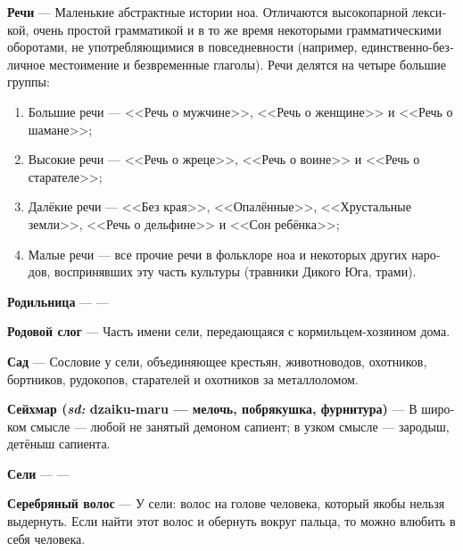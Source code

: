 \documentclass[a4paper,12pt,fleqn]{book}\usepackage{cooltooltips}\usepackage{polyglossia}\setdefaultlanguage[babelshorthands=true]{russian}\setotherlanguage{english}\defaultfontfeatures{Ligatures=TeX,Mapping=tex-text} \usepackage{xcolor}\definecolor{lightgray}{HTML}{bbbbbb}\color{lightgray}\newcommand{\ml}[3]{\textenglish{\textcolor{black}{#3}}}
\newcommand{\theterm}[3]{\textbf{\hypertarget{#1}{#2}} --- #3}
\newcommand{\theorigin}[3]{\textit{#1:} #2 --- #3}
\begin{document}
{\theterm{talks}
{Речи}
{Маленькие абстрактные истории ноа.
Отличаются высокопарной лексикой, очень простой грамматикой и в то же время некоторыми грамматическими оборотами, не употребляющимися в повседневности (например, единственно-безличное местоимение и безвременные глаголы). Речи делятся на четыре большие группы:
\begin{enumerate}
\item Большие речи --- <<Речь о мужчине>>, <<Речь о женщине>> и <<Речь о шамане>>;
\item Высокие речи --- <<Речь о жреце>>, <<Речь о воине>> и <<Речь о старателе>>;
\item Далёкие речи --- <<Без края>>, <<Опалённые>>, <<Хрустальные земли>>, <<Речь о дельфине>> и <<Сон ребёнка>>;
\item Малые речи --- все прочие речи в фольклоре ноа и некоторых других народов, воспринявших эту часть культуры (травники Дикого Юга, трами).
\end{enumerate}}

\theterm{bearer}
{Родильница}
{---}

\theterm{family-syllable}
{Родовой слог}
{Часть имени сели, передающаяся с кормильцем-хозяином дома.}

\theterm{garden}
{Сад}
{Сословие у сели, объединяющее крестьян, животноводов, охотников, бортников, рудокопов, старателей и охотников за металлоломом.}

\theterm{seijmar}
{Сейхмар (\theorigin{sd}{dzaiku-maru}{мелочь, побрякушка, фурнитура})}
{В широком смысле --- любой не занятый демоном сапиент; в узком смысле --- зародыш, детёныш сапиента.}

\theterm{seli}
{Сели}
{---}

\theterm{silver-hair}
{Серебряный волос}
{У сели: волос на голове человека, который якобы нельзя выдернуть.
Если найти этот волос и обернуть вокруг пальца, то можно влюбить в себя человека.}

}
\end{document}
